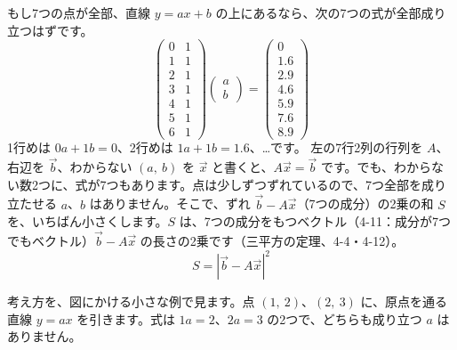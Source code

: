 もし7つの点が全部、直線 $y=ax+b$ の上にあるなら、次の7つの式が全部成り立つはずです。
\[ \begin{pmatrix}0&1\\1&1\\2&1\\3&1\\4&1\\5&1\\6&1\end{pmatrix}\begin{pmatrix}a\\b\end{pmatrix}=\begin{pmatrix}0\\1.6\\2.9\\4.6\\5.9\\7.6\\8.9\end{pmatrix} \]
1行めは $0a+1b=0$、2行めは $1a+1b=1.6$、…です。
左の7行2列の行列を $A$、右辺を $\vec b$、わからない $(a,\ b)$ を $\vec x$ と書くと、$A\vec x=\vec b$ です。でも、わからない数2つに、式が7つもあります。点は少しずつずれているので、7つ全部を成り立たせる $a$、$b$ はありません。そこで、ずれ $\vec b-A\vec x$（7つの成分）の2乗の和 $S$ を、いちばん小さくします。$S$ は、7つの成分をもつベクトル（4-11：成分が7つでもベクトル）$\vec b-A\vec x$ の長さの2乗です（三平方の定理、4-4・4-12）。
\[ S=|\vec b-A\vec x|^2 \]

考え方を、図にかける小さな例で見ます。点 $(1,\ 2)$、$(2,\ 3)$ に、原点を通る直線 $y=ax$ を引きます。式は $1a=2$、$2a=3$ の2つで、どちらも成り立つ $a$ はありません。

